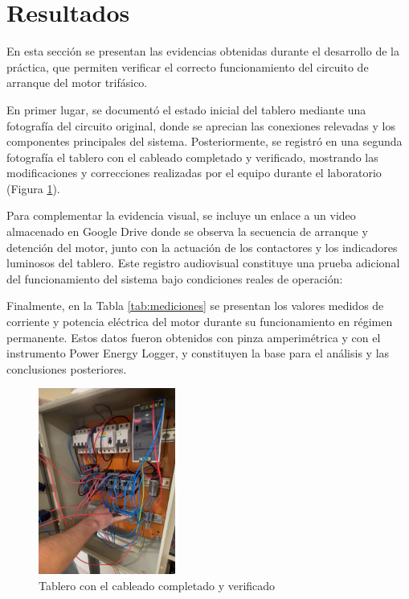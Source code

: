 \section{Resultados}

En esta sección se presentan las evidencias obtenidas durante el desarrollo de la práctica, que permiten verificar el correcto funcionamiento del circuito de arranque del motor trifásico.

En primer lugar, se documentó el estado inicial del tablero mediante una fotografía del circuito original, donde se aprecian las conexiones relevadas y los componentes principales del sistema. Posteriormente, se registró en una segunda fotografía el tablero con el cableado completado y verificado, mostrando las modificaciones y correcciones realizadas por el equipo durante el laboratorio (Figura \ref{fig:circuito_completo}).

Para complementar la evidencia visual, se incluye un enlace a un video almacenado en Google Drive donde se observa la secuencia de arranque y detención del motor, junto con la actuación de los contactores y los indicadores luminosos del tablero. Este registro audiovisual constituye una prueba adicional del funcionamiento del sistema bajo condiciones reales de operación:


Finalmente, en la Tabla \ref{tab:mediciones} se presentan los valores medidos de corriente y potencia eléctrica del motor durante su funcionamiento en régimen permanente. Estos datos fueron obtenidos con pinza amperimétrica y con el instrumento Power Energy Logger, y constituyen la base para el análisis y las conclusiones posteriores.


\begin{figure}[H]
\centering
\includegraphics[width=0.4\textwidth]{anexos/circuitoCompleto.png}
\caption{Tablero con el cableado completado y verificado}
\label{fig:circuito_completo}
\end{figure}

